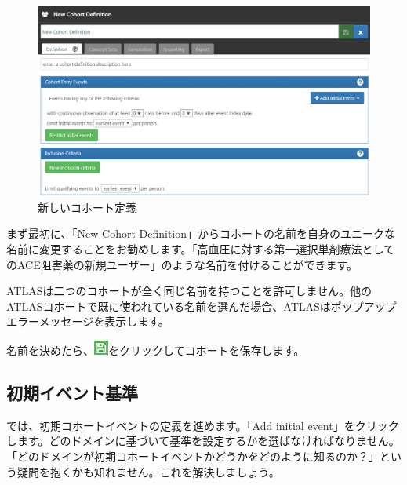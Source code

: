 \documentclass[
  11pt]{book}
\makeatletter
\newenvironment{kframe}{%
\medskip{}
\setlength{\fboxsep}{.8em}
 \def\at@end@of@kframe{}%
 \ifinner\ifhmode%
  \def\at@end@of@kframe{\end{minipage}}%
  \begin{minipage}{\columnwidth}%
 \fi\fi%
 \def\FrameCommand##1{\hskip\@totalleftmargin \hskip-\fboxsep
 \colorbox{myShadeColor}{##1}\hskip-\fboxsep
     \hskip-\linewidth \hskip-\@totalleftmargin \hskip\columnwidth}%
 \MakeFramed {\advance\hsize-\width
   \@totalleftmargin\z@ \linewidth\hsize
   \@setminipage}}%
 {\par\unskip\endMakeFramed%
 \at@end@of@kframe}
\newenvironment{rmdblock}[1]
  {
  \begin{itemize}
  \renewcommand{\labelitemi}{
    \raisebox{-.7\height}[0pt][0pt]{
      {\setkeys{Gin}{width=3em,keepaspectratio}\texttt{[image: images/\#1]}}
    }
  }
  \setlength{\fboxsep}{1em}
  \begin{kframe}
  \item
  }
  {
  \end{kframe}
  \end{itemize}
  }
\newenvironment{rmdimportant}
  {\begin{rmdblock}{important}}
  {\end{rmdblock}}
\theoremstyle{definition}
\theoremstyle{definition}
\theoremstyle{definition}
\theoremstyle{definition}
\theoremstyle{remark}
\makeatother
\begin{document}
\begin{figure}

{\centering \includegraphics[width=1\linewidth]{images/Cohorts/ATLAS-defineacohort} 

}

\caption{新しいコホート定義}\label{fig:ATLASdefineacohort}
\end{figure}

まず最初に、「New Cohort Definition」からコホートの名前を自身のユニークな名前に変更することをお勧めします。「高血圧に対する第一選択単剤療法としてのACE阻害薬の新規ユーザー」のような名前を付けることができます。

\begin{rmdimportant}
ATLASは二つのコホートが全く同じ名前を持つことを許可しません。他のATLASコホートで既に使われている名前を選んだ場合、ATLASはポップアップエラーメッセージを表示します。
\end{rmdimportant}

名前を決めたら、\includegraphics{images/Cohorts/save.png}をクリックしてコホートを保存します。

\subsection{初期イベント基準}\label{ux521dux671fux30a4ux30d9ux30f3ux30c8ux57faux6e96}

では、初期コホートイベントの定義を進めます。「Add initial event」をクリックします。どのドメインに基づいて基準を設定するかを選ばなければなりません。「どのドメインが初期コホートイベントかどうかをどのように知るのか？」という疑問を抱くかも知れません。これを解決しましょう。
\end{document}
